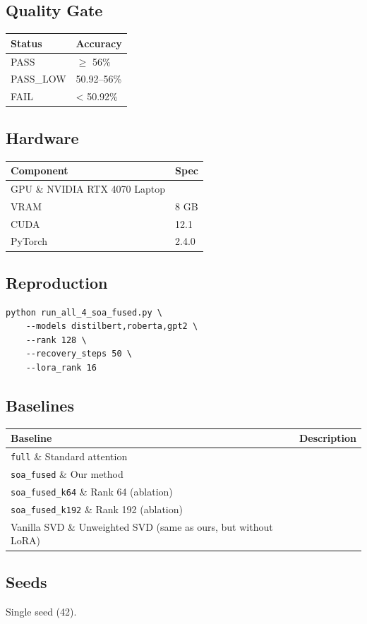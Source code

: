 \subsection{Quality Gate}

\begin{table}[H]
\centering
\small
\begin{tabular}{ll}
\toprule
\textbf{Status} & \textbf{Accuracy} \\
\midrule
PASS & $\ge$ 56\% \\
PASS\_LOW & 50.92--56\% \\
FAIL & < 50.92\% \\
\bottomrule
\end{tabular}
\end{table}

\subsection{Hardware}

\begin{table}[H]
\centering
\small
\begin{tabular}{ll}
\toprule
\textbf{Component} & \textbf{Spec} \\
\midrule
GPU \& NVIDIA RTX 4070 Laptop \\
VRAM & 8 GB \\
CUDA & 12.1 \\
PyTorch & 2.4.0 \\
\bottomrule
\end{tabular}
\end{table}

\subsection{Reproduction}

\begin{lstlisting}
python run_all_4_soa_fused.py \
    --models distilbert,roberta,gpt2 \
    --rank 128 \
    --recovery_steps 50 \
    --lora_rank 16
\end{lstlisting}

\subsection{Baselines}

\begin{table}[H]
\centering
\small
\begin{tabular}{ll}
\toprule
\textbf{Baseline} & \textbf{Description} \\
\midrule
\texttt{full} \& Standard attention \\
\texttt{soa\_fused} \& Our method \\
\texttt{soa\_fused\_k64} \& Rank 64 (ablation) \\
\texttt{soa\_fused\_k192} \& Rank 192 (ablation) \\
Vanilla SVD \& Unweighted SVD (same as ours, but without LoRA) \\
\bottomrule
\end{tabular}
\end{table}

\subsection{Seeds}

Single seed (42).


